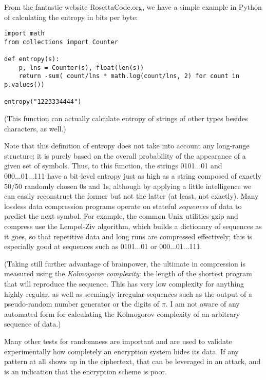 \documentclass[%
 aip,
 jmp,%
 amsmath,amssymb,
 reprint,%
]{revtex4-1}
\begin{document}
From the fantastic website RosettaCode.org, we have a simple example
in Python of calculating the entropy in bits per byte:

\begin{widetext}
\begin{verbatim}
import math
from collections import Counter

def entropy(s):
    p, lns = Counter(s), float(len(s))
    return -sum( count/lns * math.log(count/lns, 2) for count in p.values())

entropy("1223334444")
\end{verbatim}
\end{widetext}

(This function can actually calculate entropy of strings of other
types besides characters, as well.)

Note that this definition of entropy does not take into account any
long-range structure; it is purely based on the overall probability of
the appearance of a given set of symbols.  Thus, to this function, the
strings 0101...01 and 000...01...111 have a bit-level entropy just as
high as a string composed of exactly 50/50 randomly chosen 0s and 1s,
although by applying a little intelligence we can easily reconstruct
the former but not the latter (at least, not exactly).  Many lossless
data compression programs operate on stateful \emph{sequences} of data to
predict the next symbol.  For example, the common Unix utilities gzip
and compress use the Lempel-Ziv algorithm, which builds a dictionary
of sequences as it goes, so that repetitive data and long runs are
compressed effectively; this is especially good at sequences such as
0101...01 or 000...01...111.

(Taking still further advantage of brainpower, the ultimate in
compression is measured using the \emph{Kolmogorov complexity}: the length
of the shortest program that will reproduce the sequence.  This has
very low complexity for anything highly regular, as well as seemingly
irregular sequences such as the output of a pseudo-random number
generator or the digits of $\pi$.  I am not aware of any automated
form for calculating the Kolmogorov complexity of an arbitrary
sequence of data.)

Many other tests for randomness are important and are used to validate
experimentally how completely an encryption system hides its data.  If
any pattern at all shows up in the ciphertext, that can be leveraged
in an attack, and is an indication that the encryption scheme is
poor.
\end{document}
